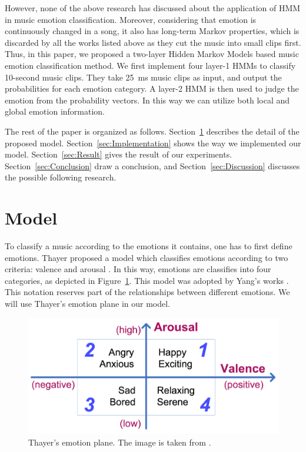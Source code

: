 \documentclass{IEEEtran}
\begin{document}
  However, none of the above research has discussed about the application of
  HMM in music emotion classification. Moreover, considering that emotion is
  continuously changed in a song, it also has long-term Markov
  properties, which is discarded by all the works listed above as they cut
  the music into small clips first. Thus, in this paper, we proposed a
  two-layer Hidden Markov Models based music emotion classification method. We
  first implement four layer-1 HMMs to classify 10-second music clips. They
  take 25~ms music clips as input, and output the probabilities for each
  emotion category. A layer-2 HMM is then used to judge the emotion from the
  probability vectors. In this way we can utilize both local and global emotion
  information.

  The rest of the paper is organized as follows. Section~\ref{sec:Model}
  describes the detail of the proposed model. Section~\ref{sec:Implementation}
  shows the way we implemented our model. Section~\ref{sec:Result} gives the
  result of our experiments. Section~\ref{sec:Conclusion} draw a conclusion,
  and Section~\ref{sec:Discussion} discusses the possible following research.

  \section{Model}
  \label{sec:Model}

  To classify a music according to the emotions it contains, one has to first
  define emotions. Thayer proposed a model which classifies emotions
  according to two criteria: valence and arousal
  \cite{thayer1989biopsychology}. In this way, emotions are classifies into
  four categories, as depicted in Figure~\ref{fig:emotion}. This model was adopted by
  Yang's works \cite{yang2006music,yang2008toward}. This notation reserves
  part of the relationships between different emotions. We will use Thayer's
  emotion plane in our model.

  \begin{figure}[htbp]
    \centering
    \includegraphics[width=\columnwidth]{emotion.png}
    \caption{Thayer's emotion plane. The image is taken from \cite{yang2006music}.}
    \label{fig:emotion}
  \end{figure}
\end{document}
